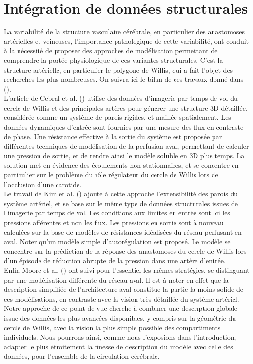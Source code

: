 \section{Intégration de données structurales}
La variabilité de la structure vasculaire cérébrale, en particulier des anastomoses artérielles et
veineuses, l'importance pathologique de cette variabilité, ont conduit à la nécessité de proposer des
approches de modélisation permettant de comprendre la portée physiologique de ces variantes
structurales. C'est la structure artérielle, en particulier le polygone de Willis, qui a fait l'objet des
recherches les plus nombreuses. On suivra ici le bilan de ces travaux donné dans (\cite{David2008}).\\
L'article de Cebral et al. (\cite{Cebral2003}) utilise des données d'imagerie par temps de vol du cercle de Willis
et des principales artères pour générer une structure 3D détaillée, considérée comme un système de
parois rigides, et maillée spatialement. Les données dynamiques d'entrée sont fournies par une
mesure des flux en contraste de phase. Une résistance effective à la sortie du système est proposée
par différentes techniques de modélisation de la perfusion aval, permettant de calculer une pression
de sortie, et de rendre ainsi le modèle soluble en 3D plus temps. La solution met en évidence des
écoulements non stationnaires, et se concentre en particulier sur le problème du rôle régulateur du
cercle de Willis lors de l'occlusion d'une carotide.\\
Le travail de Kim et al. (\cite{Kim2006}) ajoute à cette approche l'extensibilité des parois du système
artériel, et se base sur le même type de données structurales issues de l'imagerie par temps de vol.
Les conditions aux limites en entrée sont ici les pressions afférentes et non les flux. Les pressions en
sortie sont à nouveau calculées sur la base de modèles de résistances idéalisées du réseau perfusant
en aval. Noter qu'un modèle simple d'autorégulation est proposé. Le modèle se concentre sur la
prédiction de la réponse des anastomoses du cercle de Willis lors d'un épisode de réduction abrupte
de la pression dans une artère d'entrée.\\
Enfin Moore et al. (\cite{Moore2006}) ont suivi pour l'essentiel les mêmes stratégies, se distinguant par une
modélisation différente du réseau aval. Il est à noter en effet que la description simplifiée de
l'architecture aval constitue la partie la moins solide de ces modélisations, en contraste avec la vision
très détaillée du système artériel. Notre approche de ce point de vue cherche à combiner une
description globale issue des données les plus avancées disponibles, y compris sur la géométrie du
cercle de Willis, avec la vision la plus simple possible des compartiments individuels. Nous pourrons
ainsi, comme nous l'exposions dans l'introduction, adapter le plus étroitement la finesse de description
du modèle avec celle des données, pour l'ensemble de la circulation cérébrale.
